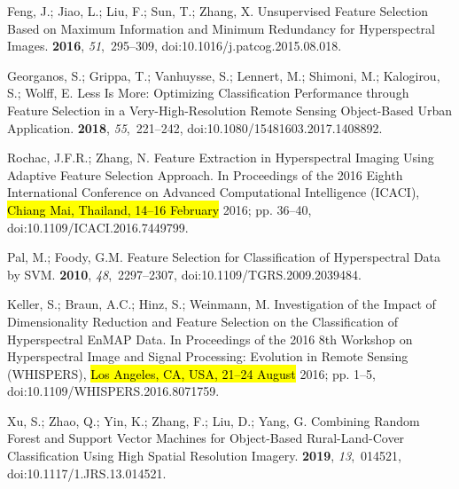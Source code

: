 \documentclass[remotesensing,article,accept,moreauthors,pdftex]{Definitions/mdpi}
\begin{document}
\begin{thebibliography}{999}
Feng, J.; Jiao, L.; Liu, F.; Sun, T.; Zhang, X.
\newblock Unsupervised Feature Selection Based on Maximum Information and
  Minimum Redundancy for Hyperspectral Images.
 {\bf 2016}, {\em 51},~295--309, doi:10.1016/j.patcog.2015.08.018.

Georganos, S.; Grippa, T.; Vanhuysse, S.; Lennert, M.; Shimoni, M.; Kalogirou,
  S.; Wolff, E.
\newblock Less Is More: Optimizing Classification Performance through Feature
  Selection in a Very-High-Resolution Remote Sensing Object-Based Urban
  Application.
 {\bf 2018}, {\em 55},~221--242, doi:10.1080/15481603.2017.1408892.

Rochac, J.F.R.; Zhang, N.
\newblock Feature Extraction in Hyperspectral Imaging Using Adaptive Feature
  Selection Approach.
\newblock  In Proceedings of the 2016 {{Eighth International Conference}} on {{Advanced Computational
  Intelligence}} ({{ICACI}}),  \hl{Chiang Mai, Thailand, 14--16 February} 2016; pp. 36--40, doi:10.1109/ICACI.2016.7449799.

Pal, M.; Foody, G.M.
\newblock Feature {{Selection}} for {{Classification}} of {{Hyperspectral
  Data}} by {{SVM}}.
 {\bf 2010},
  {\em 48},~2297--2307, doi:10.1109/TGRS.2009.2039484.

Keller, S.; Braun, A.C.; Hinz, S.; Weinmann, M.
\newblock Investigation of the Impact of Dimensionality Reduction and Feature
  Selection on the Classification of Hyperspectral {{EnMAP}} Data.
\newblock  In Proceedings of the 2016 8th {{Workshop}} on {{Hyperspectral Image}} and {{Signal
  Processing}}: Evolution in {{Remote Sensing}} ({{WHISPERS}}),  \hl{Los Angeles, CA, USA, 21--24 August} 2016; pp.
  1--5, doi:10.1109/WHISPERS.2016.8071759.

Xu, S.; Zhao, Q.; Yin, K.; Zhang, F.; Liu, D.; Yang, G.
\newblock Combining Random Forest and Support Vector Machines for Object-Based
  Rural-Land-Cover Classification Using High Spatial Resolution Imagery.
 {\bf 2019}, {\em 13},~014521, doi:10.1117/1.JRS.13.014521.


\end{thebibliography}
\end{document}
